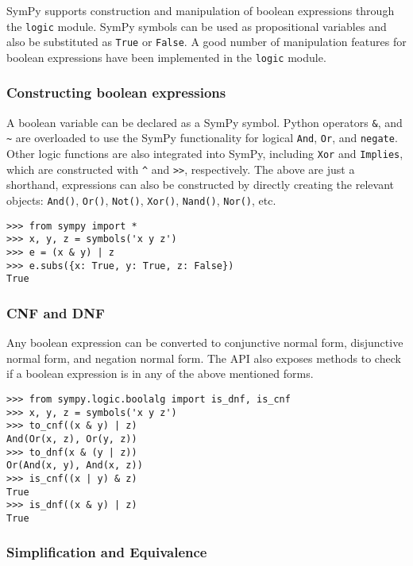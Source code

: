 
SymPy supports construction and manipulation of boolean expressions
through the \texttt{logic} module. SymPy symbols can be used as
propositional variables and also be substituted as \texttt{True}
or \texttt{False}. A good number of manipulation features for boolean
expressions have been implemented in the \texttt{logic} module.

\subsubsection{Constructing boolean expressions}

A boolean variable can be declared as a SymPy symbol. Python operators
\texttt{\&}, \texttt{\textbar{}} and \texttt{\textasciitilde{}} are overloaded
to use the SymPy functionality for logical \texttt{And}, \texttt{Or}, and
\texttt{negate}.  Other logic functions are also integrated into SymPy,
including \texttt{Xor} and \texttt{Implies}, which are constructed with
\texttt{\^{}} and \texttt{\textgreater{}\textgreater{}}, respectively.  The above
are just a shorthand, expressions can also be constructed by directly creating
the relevant objects: \verb|And()|, \verb|Or()|, \verb|Not()|, \verb|Xor()|,
\verb|Nand()|, \verb|Nor()|, etc.

\begin{verbatim}
>>> from sympy import *
>>> x, y, z = symbols('x y z')
>>> e = (x & y) | z
>>> e.subs({x: True, y: True, z: False})
True
\end{verbatim}

\subsubsection{CNF and DNF}

Any boolean expression can be converted to conjunctive normal form, disjunctive
normal form, and negation normal form. The API also exposes methods to check if
a boolean expression is in any of the above mentioned forms.

\begin{verbatim}
>>> from sympy.logic.boolalg import is_dnf, is_cnf
>>> x, y, z = symbols('x y z')
>>> to_cnf((x & y) | z)
And(Or(x, z), Or(y, z))
>>> to_dnf(x & (y | z))
Or(And(x, y), And(x, z))
>>> is_cnf((x | y) & z)
True
>>> is_dnf((x & y) | z)
True
\end{verbatim}

\subsubsection{Simplification and Equivalence}

